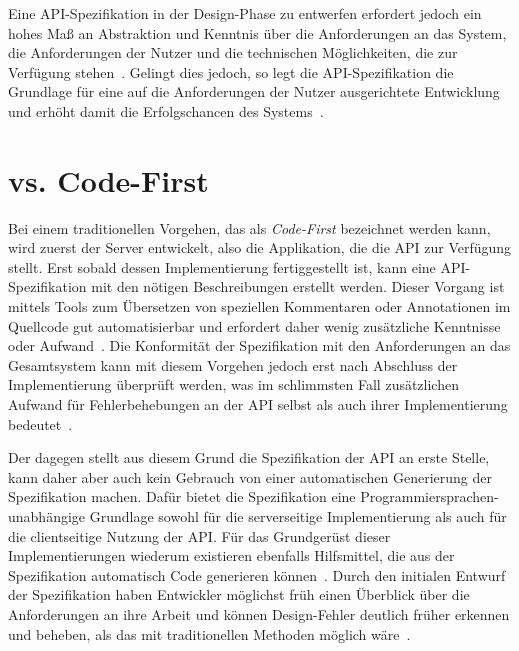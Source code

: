 Eine \ac{API}-Spezifikation in der Design-Phase zu entwerfen erfordert jedoch ein hohes Maß an Abstraktion und Kenntnis über die Anforderungen an das System, die Anforderungen der Nutzer und die technischen Möglichkeiten, die zur Verfügung stehen~\cite[362]{de23}.
Gelingt dies jedoch, so legt die \ac{API}-Spezifikation die Grundlage für eine auf die Anforderungen der Nutzer ausgerichtete Entwicklung und erhöht damit die Erfolgschancen des Systems~\cite[1627]{cha21}.

\section{\AF vs. Code-First}
Bei einem traditionellen Vorgehen, das als \emph{Code-First} bezeichnet werden kann, wird zuerst der Server entwickelt, also die Applikation, die die \ac{API} zur Verfügung stellt.
Erst sobald dessen Implementierung fertiggestellt ist, kann eine \ac{API}-Spezifikation mit den nötigen Beschreibungen erstellt werden.
Dieser Vorgang ist mittels Tools zum Übersetzen von speziellen Kommentaren oder Annotationen im Quellcode gut automatisierbar und erfordert daher wenig zusätzliche Kenntnisse oder Aufwand~\cite{ope24}.
Die Konformität der Spezifikation mit den Anforderungen an das Gesamtsystem kann mit diesem Vorgehen jedoch erst nach Abschluss der Implementierung überprüft werden, was im schlimmsten Fall zusätzlichen Aufwand für Fehlerbehebungen an der \ac{API} selbst als auch ihrer Implementierung bedeutet~\cite{vol22}.

Der \AFA dagegen stellt \ua aus diesem Grund die Spezifikation der \ac{API} an erste Stelle, kann daher aber auch kein Gebrauch von einer automatischen Generierung der Spezifikation machen.
Dafür bietet die Spezifikation eine Programmiersprachen-unabhängige Grundlage sowohl für die serverseitige Implementierung als auch für die clientseitige Nutzung der \ac{API}.
Für das Grundgerüst dieser Implementierungen wiederum existieren ebenfalls Hilfsmittel, die aus der Spezifikation automatisch Code generieren können~\cite{ope24}.
Durch den initialen Entwurf der Spezifikation haben Entwickler möglichst früh einen Überblick über die Anforderungen an ihre Arbeit und können Design-Fehler deutlich früher erkennen und beheben, als das mit traditionellen Methoden möglich wäre~\cite[1627]{cha21}.

